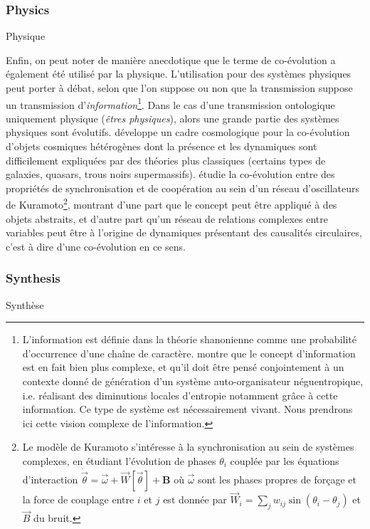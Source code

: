 \subsubsection{Physics}{Physique}

Enfin, on peut noter de manière anecdotique que le terme de co-évolution a également été utilisé par la physique. L'utilisation pour des systèmes physiques peut porter à débat, selon que l'on suppose ou non que la transmission suppose un transmission d'\emph{information}\footnote{L'information est définie dans la théorie shanonienne comme une probabilité d'occurrence d'une chaîne de caractère. \cite{morin1976methode} montre que le concept d'information est en fait bien plus complexe, et qu'il doit être pensé conjointement à un contexte donné de génération d'un système auto-organisateur néguentropique, i.e. réalisant des diminutions locales d'entropie notamment grâce à cette information. Ce type de système est nécessairement vivant. Nous prendrons ici cette vision complexe de l'information.}. Dans le cas d'une transmission ontologique uniquement physique (\emph{êtres physiques}), alors une grande partie des systèmes physiques sont évolutifs. \cite{hopkins2008cosmological} développe un cadre cosmologique pour la co-évolution d'objets cosmiques hétérogènes dont la présence et les dynamiques sont difficilement expliquées par des théories plus classiques (certains types de galaxies, quasars, trous noirs supermassifs). \cite{antonioni2017coevolution} étudie la co-évolution entre des propriétés de synchronisation et de coopération au sein d'un réseau d'oscillateurs de Kuramoto\footnote{Le modèle de Kuramoto s'intéresse à la synchronisation au sein de systèmes complexes, en étudiant l'évolution de phases $\theta_i$ couplée par les équations d'interaction $\dot{\vec{\theta}} = \vec{\omega} + \vec{W}\left[\vec{\theta}\right] + \mathbf{B}$ où $\vec{\omega}$ sont les phases propres de forçage et la force de couplage entre $i$ et $j$ est donnée par $\vec{W}_{i} = \sum_j w_{ij} \sin\left(\theta_i - \theta_j\right)$ et $\vec{B}$ du bruit.}, montrant d'une part que le concept peut être appliqué à des objets abstraits, et d'autre part qu'un réseau de relations complexes entre variables peut être à l'origine de dynamiques présentant des causalités circulaires, c'est à dire d'une co-évolution en ce sens.


\subsubsection{Synthesis}{Synthèse}


